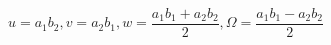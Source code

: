 \begin{equation}
u=a_1b_2, v=a_2b_1, w = \frac{a_1b_1+a_2b_2}{2},
\Omega=\frac{a_1b_1-a_2b_2}{2}
\end{equation}

